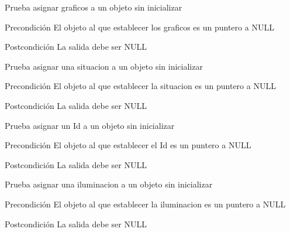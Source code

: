 \begin{DoxyRefList}
\item[\label{test__test000162}%
\hypertarget{test__test000162}{}%
Global \hyperlink{object__test_8c_a107ab1b077a3949828a5ff42862d06dd}{test2\-\_\-object\-\_\-set\-\_\-graphics} ()]Prueba asignar graficos a un objeto sin inicializar \begin{DoxyPrecond}{Precondición}
El objeto al que establecer los graficos es un puntero a N\-U\-L\-L 
\end{DoxyPrecond}
\begin{DoxyPostcond}{Postcondición}
La salida debe ser N\-U\-L\-L  
\end{DoxyPostcond}

\item[\label{test__test000174}%
\hypertarget{test__test000174}{}%
Global \hyperlink{object__test_8c_a4df73347d6e6855a792a098b16cf3687}{test2\-\_\-object\-\_\-set\-\_\-\-Hidden} ()]Prueba asignar una situacion a un objeto sin inicializar \begin{DoxyPrecond}{Precondición}
El objeto al que establecer la situacion es un puntero a N\-U\-L\-L 
\end{DoxyPrecond}
\begin{DoxyPostcond}{Postcondición}
La salida debe ser N\-U\-L\-L  
\end{DoxyPostcond}

\item[\label{test__test000164}%
\hypertarget{test__test000164}{}%
Global \hyperlink{object__test_8c_a63883336ddb78c64280e2a26a0991a99}{test2\-\_\-object\-\_\-set\-\_\-\-Id} ()]Prueba asignar un Id a un objeto sin inicializar \begin{DoxyPrecond}{Precondición}
El objeto al que establecer el Id es un puntero a N\-U\-L\-L 
\end{DoxyPrecond}
\begin{DoxyPostcond}{Postcondición}
La salida debe ser N\-U\-L\-L  
\end{DoxyPostcond}

\item[\label{test__test000178}%
\hypertarget{test__test000178}{}%
Global \hyperlink{object__test_8c_a50fc992ba4d2c52584ea3f9f6c742e79}{test2\-\_\-object\-\_\-set\-\_\-\-Illuminates} ()]Prueba asignar una iluminacion a un objeto sin inicializar \begin{DoxyPrecond}{Precondición}
El objeto al que establecer la iluminacion es un puntero a N\-U\-L\-L 
\end{DoxyPrecond}
\begin{DoxyPostcond}{Postcondición}
La salida debe ser N\-U\-L\-L  
\end{DoxyPostcond}


\end{DoxyRefList}
